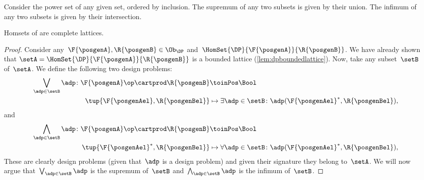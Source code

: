 \begin{example}
    Consider the power set of any given set, ordered by inclusion.
    The supremum of any two subsets is given by their union.
    The infimum of any two subsets is given by their intersection.
\end{example}

\begin{lemma}
    \label{lem:DP-homsets-complete-lattice}
    Homsets of \DP are complete lattices.
\end{lemma}

\begin{proof}
    Consider any~$\F{\posgenA},\R{\posgenB}\in \Ob_\DP$ and~$\HomSet{\DP}{\F{\posgenA}}{\R{\posgenB}}$.
    We have already shown that $\setA=\HomSet{\DP}{\F{\posgenA}}{\R{\posgenB}}$ is a bounded lattice (\cref{lem:dpboundedlattice}).
    Now, take any subset~$\setB$ of~$\setA$.
    We define the following two design problems:
    \begin{equation*}
        \begin{aligned}
            \bigvee_{\adp \in \setB} \adp\colon \F{\posgenA}\op \cartprod \R{\posgenB} & \toinPos \Bool                                                             \\
            \tup{\F{\posgenAel},\R{\posgenBel}}                                        & \mapsto \exists \adp\in \setB\colon \adp(\F{\posgenAel}^*,\R{\posgenBel}),
        \end{aligned}
    \end{equation*}
    and
    \begin{equation*}
        \begin{aligned}
            \bigwedge_{\adp \in \setB} \adp\colon \F{\posgenA}\op \cartprod \R{\posgenB} & \toinPos \Bool                                                             \\
            \tup{\F{\posgenAel}^*,\R{\posgenBel}}                                        & \mapsto \forall \adp\in \setB\colon \adp(\F{\posgenAel}^*,\R{\posgenBel}),
        \end{aligned}
    \end{equation*}
    These are clearly design problems (given that~$\adp$ is a design problem) and given their signature they belong to~$\setA$.
    We will now argue that~$\bigvee_{\adp \in \setB} \adp$ is the supremum of~$\setB$ and~$\bigwedge_{\adp \in \setB} \adp$ is the infimum of~$\setB$.

\end{proof}
